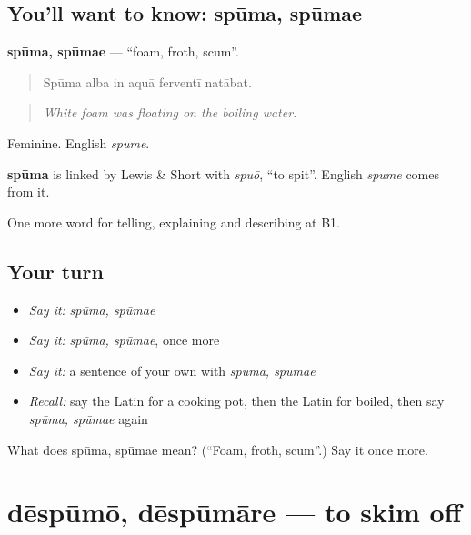 \subsection*{You'll want to know: spūma, spūmae}
\textbf{spūma, spūmae} — \textquotedblleft{}foam, froth, scum\textquotedblright{}.

\begin{quote}
Spūma alba in aquā ferventī natābat.
\end{quote}

\begin{quote}
\emph{White foam was floating on the boiling water.}
\end{quote}

Feminine. English \emph{spume}.

\begin{cousinweb}
\textbf{spūma} is linked by Lewis \& Short with \emph{spuō}, \textquotedblleft{}to spit\textquotedblright{}. English \emph{spume} comes from it.
\end{cousinweb}

\begin{grammarlens}[title={What you've built}]
One more word for telling, explaining and describing at B1.
\end{grammarlens}

\subsection*{Your turn}
\begin{itemize}
\raggedright
  \item \emph{Say it:} \emph{spūma, spūmae}
  \item \emph{Say it:} \emph{spūma, spūmae}, once more
  \item \emph{Say it:} a sentence of your own with \emph{spūma, spūmae}
  \item \emph{Recall:} say the Latin for a cooking pot, then the Latin for boiled, then say \emph{spūma, spūmae} again
\end{itemize}

\begin{tcolorbox}[breakable,colback=teal!4,colframe=teal!35!black,title={Before you move on}]
What does spūma, spūmae mean? (\textquotedblleft{}Foam, froth, scum\textquotedblright{}.) Say it once more.
\end{tcolorbox}
\section[dēspūmō, dēspūmāre]{dēspūmō, dēspūmāre — to skim off}

